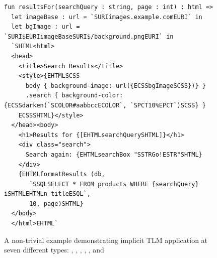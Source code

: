 \begin{figure}[h]
\begin{lstlisting}[deletekeywords={for}, escapechar=@]
fun resultsFor(searchQuery : string, page : int) : html => 
  let imageBase : url = `SURIimages.example.comEURI` in 
  let bgImage : url = `SURI$EURIimageBaseSURI$/background.pngEURI` in 
  `SHTML<html>
  <head>
    <title>Search Results</title>
    <style>{EHTMLSCSS
      body { background-image: url({ECSSbgImageSCSS})} }
      .search { background-color: {ECSSdarken(`SCOLOR#aabbccECOLOR`, `SPCT10%EPCT`)SCSS} }
    ECSSSHTML}</style>
  </head><body>
    <h1>Results for {[EHTMLsearchQuerySHTML]}</h1>
    <div class="search">
      Search again: {EHTMLsearchBox "SSTRGo!ESTR"SHTML}
    </div>
    {EHTMLformatResults (db, 
       `SSQLSELECT * FROM products WHERE {searchQuery} iSHTMLEHTMLn titleESQL`,
       10, page)SHTML}
  </body>
  </html>EHTML`
\end{lstlisting}
\caption{A non-trivial example demonstrating implicit TLM application at seven different types: , , , , ,  and }
\label{fig:big-html-example}
\end{figure}


